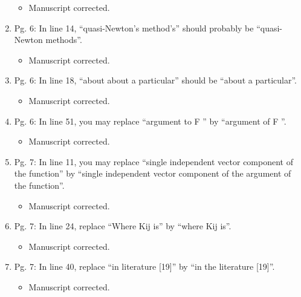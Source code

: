 \documentclass{article}
\begin{document}
\begin{enumerate}
{\color{red}  
\begin{itemize}
     \item
 Manuscript corrected. 
  \end{itemize}}

 \item Pg. 6: In line 14, “quasi-Newton’s method’s” should probably be “quasi-Newton
methods”.

{\color{red}  
\begin{itemize}
     \item
 Manuscript corrected. 
  \end{itemize}}

 \item Pg. 6: In line 18, “about about a particular” should be “about a particular”.

{\color{red}  
\begin{itemize}
     \item
 Manuscript corrected. 
  \end{itemize}}

 \item Pg. 6: In line 51, you may replace “argument to F ” by “argument of F ”.

{\color{red}  
\begin{itemize}
     \item
 Manuscript corrected. 
  \end{itemize}}

 \item Pg. 7: In line 11, you may replace “single independent vector component of the
function” by “single independent vector component of the argument of the function”.

{\color{red}  
\begin{itemize}
     \item
 Manuscript corrected. 
  \end{itemize}}

 \item Pg. 7: In line 24, replace “Where Kij is” by “where Kij is”.

{\color{red}  
\begin{itemize}
     \item
 Manuscript corrected. 
  \end{itemize}}

 \item Pg. 7: In line 40, replace “in literature [19]” by “in the literature [19]”.

{\color{red}  
\begin{itemize}
     \item
 Manuscript corrected. 
  \end{itemize}}


\end{enumerate}
\end{document}
